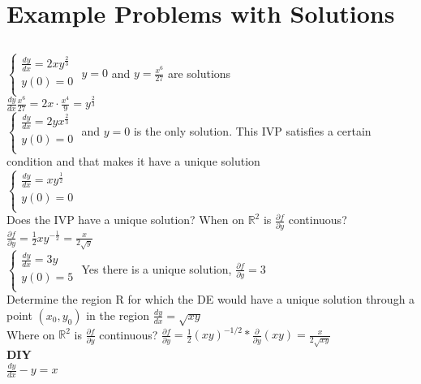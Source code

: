 \documentclass{article}
\begin{document}
\pagebreak
\section{Example Problems with Solutions}
\subsection{}
$\begin{cases}
    \frac{dy}{dx} = 2xy^\frac{2}{3}\\
    y(0) = 0  \\
\end{cases}$
$y=0$ and $y=\frac{x^6}{27}$ are solutions \\[0.05in]$\frac{dy}{dx} \frac{x^6}{27} = 2x \cdot \frac{x^4}{9} = y^\frac{2}{3}$
\\[0.05in]$\begin{cases}
    \frac{dy}{dx} = 2yx^\frac{2}{3}\\
    y(0) = 0  \\[0.05in]
\end{cases}$ and $y=0$ is the only solution. This IVP satisfies a certain condition and that makes it have a unique solution
\\[0.05in]$\begin{cases}
    \frac{dy}{dx} = xy^\frac{1}{2}\\
    y(0) = 0  \\
\end{cases}$
\\ Does the IVP have a unique solution? When on $\mathbb{R}^2$ is $\frac{\partial f}{\partial y}$ continuous? $\frac{\partial f }{ \partial y }= \frac{1}{2} xy^{-\frac{1}{2}} = \frac{x}{2\sqrt{y}}$
\\$\begin{cases}
    \frac{dy}{dx} = 3y\\
    y(0) = 5  \\
\end{cases}$ 
Yes there is a unique solution, $\frac{\partial f}{\partial y} = 3$\\
Determine the region R for which the DE would have a unique solution through a point $(x_0, y_0)$ in the region
$\frac{dy}{dx} = \sqrt{xy}$ \\ Where on $\mathbb{R}^2$ is $\frac{\partial f}{\partial y}$ continuous? $\frac{\partial f}{\partial y} = \frac{1}{2}(xy)^{-1/2} * \frac{\partial}{\partial y} (xy) = \frac{x}{2\sqrt{xy}}$
\\ \textbf{DIY}
\\ $\frac{dy}{dx}-y=x$ 
\end{document}
